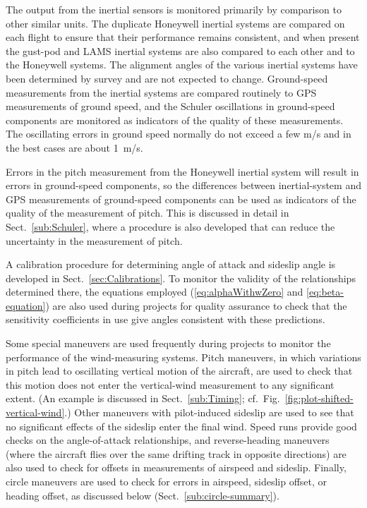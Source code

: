 \documentclass[12pt,twoside,english]{article}\usepackage[]{graphicx}\usepackage[]{color}
\let\OrgIndex\index
\renewcommand*{\index}[1]{\OrgIndex{#1}}
\begin{document}
The output from the inertial sensors is monitored primarily by comparison to other similar units. The duplicate Honeywell inertial systems are compared on each flight to ensure that their performance remains consistent, and when present the gust-pod and LAMS inertial systems are also compared to each other and to the Honeywell systems. The alignment angles of the various inertial systems have been determined by survey and are not expected to change. Ground-speed measurements from the inertial systems are compared routinely to GPS measurements of ground speed, and the Schuler oscillations in ground-speed components are monitored as indicators of the quality of these measurements. The oscillating errors in ground speed normally do not exceed a few m/s and in the best cases are about 1~m/s.

Errors in the pitch measurement from the Honeywell inertial system will result in errors in ground-speed components, so the differences between inertial-system and GPS measurements of ground-speed components can be used as indicators of the quality of the measurement of pitch. This is discussed in detail in Sect.~\ref{sub:Schuler}, where a procedure is also developed that can reduce the uncertainty in the measurement of pitch. 

A calibration procedure for determining angle of attack and sideslip angle is developed in Sect.~\ref{sec:Calibrations}. To monitor the validity of the relationships determined there, the equations employed (\eqref{eq:alphaWithwZero} and \eqref{eq:beta-equation}) are also used during projects for quality assurance to check that the sensitivity coefficients in use give angles consistent with these predictions.

Some special maneuvers are used frequently during projects to monitor the performance of the wind-measuring systems. Pitch maneuvers, in which variations in pitch lead to oscillating vertical motion of the aircraft, are used to check that this motion does not enter the vertical-wind measurement to any significant extent. (An example is discussed in Sect.~\ref{sub:Timing}; cf.~Fig.~\ref{fig:plot-shifted-vertical-wind}.) Other maneuvers with pilot-induced sideslip are used to see that no significant effects of the sideslip enter the final wind. Speed runs provide good checks on the angle-of-attack relationships, and reverse-heading maneuvers (where the aircraft flies over the same drifting track in opposite directions) are also used to check for offsets in measurements of airspeed and sideslip. Finally, circle maneuvers are used to check for errors in airspeed, sideslip offset, or heading offset, as discussed below (Sect.~\ref{sub:circle-summary}). 
\end{document}
